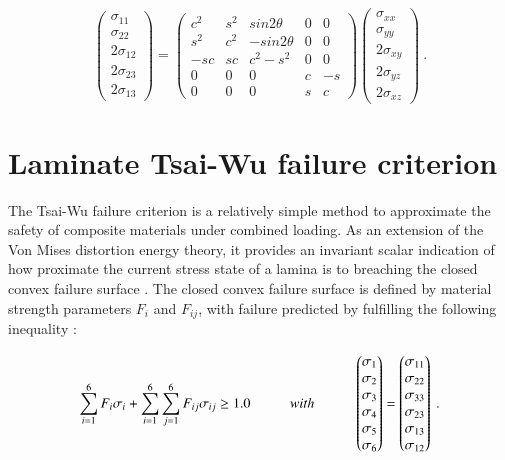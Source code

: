 \begin{equation} 
\begin{pmatrix}
\sigma_{11} \\
\sigma_{22} \\
2\sigma_{12}\\
2\sigma_{23} \\
2\sigma_{13}
\end{pmatrix}
=
\begin{pmatrix}
c^2 & s^2 & sin2\theta & 0 & 0 \\
s^2 & c^2 & -sin2\theta & 0 & 0 \\
-sc & sc & c^2 - s^2 & 0 & 0 \\
0 & 0 & 0 & c & -s \\
0 & 0 & 0 & s & c
\end{pmatrix}
\begin{pmatrix}
\sigma_{xx} \\
\sigma_{yy} \\
2\sigma_{xy}\\
2\sigma_{yz} \\
2\sigma_{xz}
\end{pmatrix}
\label{eqscomp_stress_recovery2}\ .
\end{equation}

\section{Laminate Tsai-Wu failure criterion}
\label{tsai wu background}
The Tsai-Wu failure criterion is a relatively simple method to approximate the safety of composite materials under combined loading. As an extension of the Von Mises distortion energy theory, it provides an invariant scalar indication of how proximate the current stress state of a lamina is to breaching the closed convex failure surface \cite{tsai12}. The closed convex failure surface is defined by material strength parameters $F_i$ and $F_{ij}$, with failure predicted by fulfilling the following inequality \cite{reddy2004mechanics}:

\begin{equation} 
\sum_{i=1}^{6} F_i \sigma_i + \sum_{i=1}^{6} \sum_{j=1}^{6} F_{ij} \sigma_{ij} \geq 1.0
\hspace{10mm}with\hspace{10mm}
\begin{pmatrix}
\sigma_{1} \\
\sigma_{2} \\
\sigma_{3}\\
\sigma_{4} \\
\sigma_{5} \\
\sigma_{6}
\end{pmatrix}
=
\begin{pmatrix}
\sigma_{11} \\
\sigma_{22} \\
\sigma_{33}\\
\sigma_{23} \\
\sigma_{13} \\
\sigma_{12}
\end{pmatrix}
\label{eqscomp_tsai1}\ .
\end{equation}

